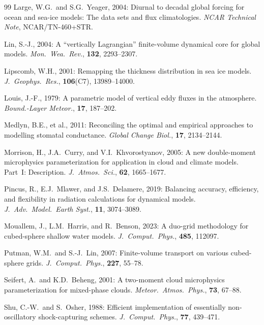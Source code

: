 \documentclass[11pt,a4paper]{article}
\begin{document}
\begin{thebibliography}{99}
Large, W.G.\ and S.G.~Yeager, 2004:
Diurnal to decadal global forcing for ocean and sea-ice models: The data
sets and flux climatologies.
\textit{NCAR Technical Note}, NCAR/TN-460+STR.

Lin, S.-J., 2004:
A ``vertically Lagrangian'' finite-volume dynamical core for global models.
\textit{Mon.\ Wea.\ Rev.}, \textbf{132}, 2293--2307.

Lipscomb, W.H., 2001:
Remapping the thickness distribution in sea ice models.
\textit{J.\ Geophys.\ Res.}, \textbf{106}(C7), 13989--14000.

Louis, J.-F., 1979:
A parametric model of vertical eddy fluxes in the atmosphere.
\textit{Bound.-Layer Meteor.}, \textbf{17}, 187--202.

Medlyn, B.E., et al., 2011:
Reconciling the optimal and empirical approaches to modelling stomatal
conductance.
\textit{Global Change Biol.}, \textbf{17}, 2134--2144.

Morrison, H., J.A.~Curry, and V.I.~Khvorostyanov, 2005:
A new double-moment microphysics parameterization for application in
cloud and climate models. Part~I: Description.
\textit{J.\ Atmos.\ Sci.}, \textbf{62}, 1665--1677.

Pincus, R., E.J.~Mlawer, and J.S.~Delamere, 2019:
Balancing accuracy, efficiency, and flexibility in radiation calculations
for dynamical models.
\textit{J.\ Adv.\ Model.\ Earth Syst.}, \textbf{11}, 3074--3089.

Mouallem, J., L.M.~Harris, and R.~Benson, 2023:
A duo-grid methodology for cubed-sphere shallow water models.
\textit{J.\ Comput.\ Phys.}, \textbf{485}, 112097.

Putman, W.M.\ and S.-J.~Lin, 2007:
Finite-volume transport on various cubed-sphere grids.
\textit{J.\ Comput.\ Phys.}, \textbf{227}, 55--78.

Seifert, A.\ and K.D.~Beheng, 2001:
A two-moment cloud microphysics parameterization for mixed-phase clouds.
\textit{Meteor.\ Atmos.\ Phys.}, \textbf{73}, 67--88.

Shu, C.-W.\ and S.~Osher, 1988:
Efficient implementation of essentially non-oscillatory shock-capturing
schemes.
\textit{J.\ Comput.\ Phys.}, \textbf{77}, 439--471.


\end{thebibliography}
\end{document}
